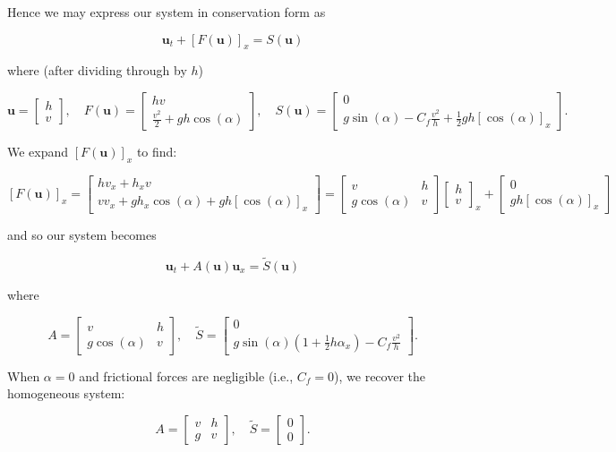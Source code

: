 Hence we may express our system in conservation form as

$$
    \textbf{u}_t + \left[ F(\textbf{u}) \right]_x = S(\textbf{u})
$$

where (after dividing through by $h$)

$$
\textbf{u} = \begin{bmatrix}
    h \\
    v
\end{bmatrix}, \quad F(\textbf{u}) = \begin{bmatrix}
    hv \\
    \frac{v^2}{2} + g h \cos{(\alpha)}
\end{bmatrix}, \quad S(\textbf{u}) = \begin{bmatrix}
    0 \\
    g \sin{(\alpha)} - C_f \frac{v^2}{h} + \frac{1}{2} g h [\cos{(\alpha)}]_x
\end{bmatrix}.
$$

We expand $[F(\textbf{u})]_x$ to find:

$$
[F(\textbf{u})]_x = \begin{bmatrix}
    h v_x + h_x v \\
    v v_x + g h_x \cos{(\alpha)} + g h [\cos{(\alpha)}]_x
\end{bmatrix} = \begin{bmatrix}
    v                & h \\
    g \cos{(\alpha)} & v
\end{bmatrix} \begin{bmatrix}
    h \\
    v
\end{bmatrix}_x + \begin{bmatrix}
    0 \\
    g h [\cos{(\alpha)}]_x
\end{bmatrix}
$$

and so our system becomes

$$
\textbf{u}_t + A(\textbf{u}) \textbf{u}_x = \tilde{S}(\textbf{u})
$$

where 

$$
A = \begin{bmatrix}
    v                & h \\
    g \cos{(\alpha)} & v
\end{bmatrix}, \quad \tilde{S} = \begin{bmatrix}
    0 \\
    g \sin{(\alpha)} \left(1 + \frac{1}{2} h \alpha_x \right) - C_f \frac{v^2}{h}
\end{bmatrix}.
$$

When $\alpha = 0$ and frictional forces are negligible (i.e., $C_f = 0$), we recover the homogeneous system:

$$
A = \begin{bmatrix}
    v  & h \\
    g  & v
\end{bmatrix}, \quad \tilde{S} = \begin{bmatrix}
    0 \\
    0
\end{bmatrix}.
$$
